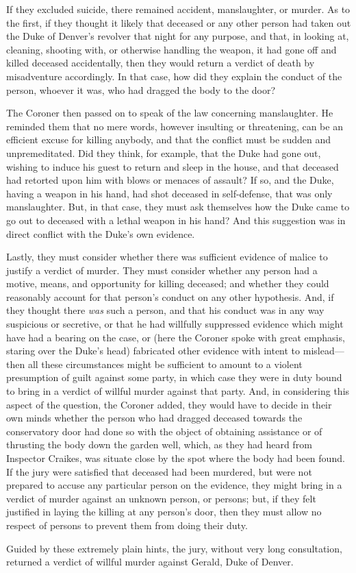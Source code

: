 If they excluded suicide, there remained accident, manslaughter, or murder. As to the first, if they thought it likely that deceased or any other person had taken out the Duke of Denver's revolver that night for any purpose, and that, in looking at, cleaning, shooting with, or otherwise handling the weapon, it had gone off and killed deceased accidentally, then they would return a verdict of death by misadventure accordingly. In that case, how did they explain the conduct of the person, whoever it was, who had dragged the body to the door?

The Coroner then passed on to speak of the law concerning manslaughter.  He reminded them that no mere words, however insulting or threatening, can be an efficient excuse for killing anybody, and that the conflict must be sudden and unpremeditated. Did they think, for example, that the Duke had gone out, wishing to induce his guest to return and sleep in the house, and that deceased had retorted upon him with blows or menaces of assault? If so, and the Duke, having a weapon in his hand, had shot deceased in self-defense, that was only manslaughter. But, in that case, they must ask themselves how the Duke came to go out to deceased with a lethal weapon in his hand? And this suggestion was in direct conflict with the Duke's own evidence.

Lastly, they must consider whether there was sufficient evidence of malice to justify a verdict of murder. They must consider whether any person had a motive, means, and opportunity for killing deceased; and whether they could reasonably account for that person's conduct on any other hypothesis. And, if they thought there \textit{was} such a person, and that his conduct was in any way suspicious or secretive, or that he had willfully suppressed evidence which might have had a bearing on the case, or (here the Coroner spoke with great emphasis, staring over the Duke's head) fabricated other evidence with intent to mislead\allowbreak---\allowbreak then all these circumstances might be sufficient to amount to a violent presumption of guilt against some party, in which case they were in duty bound to bring in a verdict of willful murder against that party.  And, in considering this aspect of the question, the Coroner added, they would have to decide in their own minds whether the person who had dragged deceased towards the conservatory door had done so with the object of obtaining assistance or of thrusting the body down the garden well, which, as they had heard from Inspector Craikes, was situate close by the spot where the body had been found. If the jury were satisfied that deceased had been murdered, but were not prepared to accuse any particular person on the evidence, they might bring in a verdict of murder against an unknown person, or persons; but, if they felt justified in laying the killing at any person's door, then they must allow no respect of persons to prevent them from doing their duty.

Guided by these extremely plain hints, the jury, without very long consultation, returned a verdict of willful murder against Gerald, Duke of Denver.
